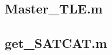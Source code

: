 \documentclass[12pt]{report}
\begin{document}
	\subsection{Master\_TLE.m}
	
	\subsection{get\_SATCAT.m}
		
	
		
	
\end{document}
